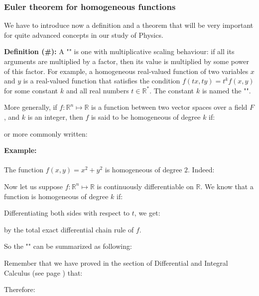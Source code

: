 	\subsubsection{Euler theorem for homogeneous functions}
	We have to introduce now a definition and a theorem that will be very important for quite advanced concepts in our study of Physics.
		
	\textbf{Definition (\#\mydef):} A "\label{homogeneous function}" is one with multiplicative scaling behaviour: if all its arguments are multiplied by a factor, then its value is multiplied by some power of this factor. For example, a homogeneous real-valued function of two variables $x$ and $y$ is a real-valued function that satisfies the condition $f(t x,t y)=t ^{k}f(x,y)$ for some constant $k$ and all real numbers $t\in \mathbb{R}^*$. The constant $k$ is named  the "".
	
	More generally, if $f:\mathbb{R}^n\mapsto \mathbb{R}$ is a function between two vector spaces over a field $F$, and $k$ is an integer, then $f$ is said to be homogeneous of degree $k$ if:
	
	or more commonly written:
	
	
	\begin{tcolorbox}[colframe=black,colback=white,sharp corners]
	\textbf{{\Large {}}Example:}\\\\
	The function $f(x,y)=x^{2}+y^{2}$ is homogeneous of degree $2$. Indeed:
	
	\end{tcolorbox}
	
	Now let us suppose $f:\mathbb{R}^n\mapsto \mathbb{R}$ is continuously differentiable on $\mathbb{R}$. We know that a function is homogeneous of degree $k$ if:
	
	Differentiating both sides with respect to $t$, we get:
	
	by the total exact differential chain rule of $f$. 
	
	So the "\label{Euler theorem for homogeneous functions}" can be summarized as following:
	
	\begin{tcolorbox}[title=Remark,colframe=black,arc=10pt]
	Remember that we have proved in the section of Differential and Integral Calculus (see page \pageref{total exact differential}) that:
	
	Therefore:
	
	\end{tcolorbox}
	
